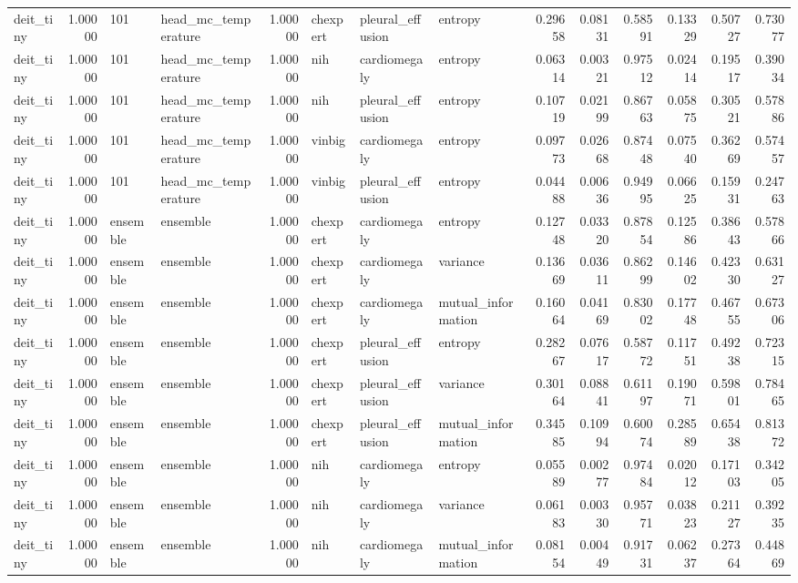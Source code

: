 \begin{tabular}{lrllrlllrrrrrr}
deit\_tiny & 1.00000 & 101 & head\_mc\_temperature & 1.00000 & chexpert & pleural\_effusion & entropy & 0.29658 & 0.08131 & 0.58591 & 0.13329 & 0.50727 & 0.73077 \\
deit\_tiny & 1.00000 & 101 & head\_mc\_temperature & 1.00000 & nih & cardiomegaly & entropy & 0.06314 & 0.00321 & 0.97512 & 0.02414 & 0.19517 & 0.39034 \\
deit\_tiny & 1.00000 & 101 & head\_mc\_temperature & 1.00000 & nih & pleural\_effusion & entropy & 0.10719 & 0.02199 & 0.86763 & 0.05875 & 0.30521 & 0.57886 \\
deit\_tiny & 1.00000 & 101 & head\_mc\_temperature & 1.00000 & vinbig & cardiomegaly & entropy & 0.09773 & 0.02668 & 0.87448 & 0.07540 & 0.36269 & 0.57457 \\
deit\_tiny & 1.00000 & 101 & head\_mc\_temperature & 1.00000 & vinbig & pleural\_effusion & entropy & 0.04488 & 0.00636 & 0.94995 & 0.06625 & 0.15931 & 0.24763 \\
deit\_tiny & 1.00000 & ensemble & ensemble & 1.00000 & chexpert & cardiomegaly & entropy & 0.12748 & 0.03320 & 0.87854 & 0.12586 & 0.38643 & 0.57866 \\
deit\_tiny & 1.00000 & ensemble & ensemble & 1.00000 & chexpert & cardiomegaly & variance & 0.13669 & 0.03611 & 0.86299 & 0.14602 & 0.42330 & 0.63127 \\
deit\_tiny & 1.00000 & ensemble & ensemble & 1.00000 & chexpert & cardiomegaly & mutual\_information & 0.16064 & 0.04169 & 0.83002 & 0.17748 & 0.46755 & 0.67306 \\
deit\_tiny & 1.00000 & ensemble & ensemble & 1.00000 & chexpert & pleural\_effusion & entropy & 0.28267 & 0.07617 & 0.58772 & 0.11751 & 0.49238 & 0.72315 \\
deit\_tiny & 1.00000 & ensemble & ensemble & 1.00000 & chexpert & pleural\_effusion & variance & 0.30164 & 0.08841 & 0.61197 & 0.19071 & 0.59801 & 0.78465 \\
deit\_tiny & 1.00000 & ensemble & ensemble & 1.00000 & chexpert & pleural\_effusion & mutual\_information & 0.34585 & 0.10994 & 0.60074 & 0.28589 & 0.65438 & 0.81372 \\
deit\_tiny & 1.00000 & ensemble & ensemble & 1.00000 & nih & cardiomegaly & entropy & 0.05589 & 0.00277 & 0.97484 & 0.02012 & 0.17103 & 0.34205 \\
deit\_tiny & 1.00000 & ensemble & ensemble & 1.00000 & nih & cardiomegaly & variance & 0.06183 & 0.00330 & 0.95771 & 0.03823 & 0.21127 & 0.39235 \\
deit\_tiny & 1.00000 & ensemble & ensemble & 1.00000 & nih & cardiomegaly & mutual\_information & 0.08154 & 0.00449 & 0.91731 & 0.06237 & 0.27364 & 0.44869 \\

\end{tabular}
